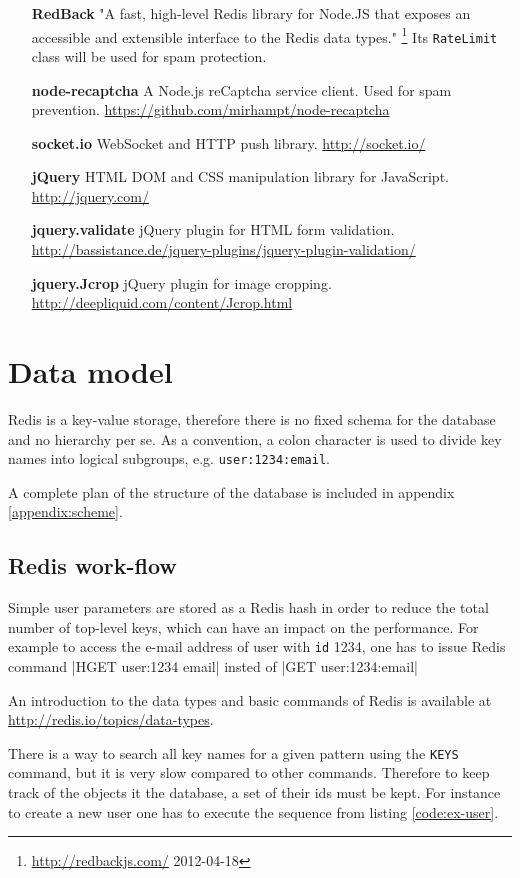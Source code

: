 \documentclass[12pt,oneside]{fithesis}
\begin{document}
\begin{itemize}
			\item[\textbf{RedBack}] "A fast, high-level Redis library for Node.JS that exposes an accessible and extensible interface to the Redis data types." \footnote{\url{http://redbackjs.com/} 2012-04-18} Its \texttt{RateLimit} class will be used for spam protection. 
			\item[\textbf{node-recaptcha}] A Node.js reCaptcha service client. Used for spam prevention. \url{https://github.com/mirhampt/node-recaptcha}
			\item[\textbf{socket.io}] WebSocket and HTTP push library. \url{http://socket.io/}
			\item[\textbf{jQuery}] HTML DOM and CSS manipulation library for JavaScript. \url{http://jquery.com/}
			\item[\textbf{jquery.validate}] jQuery plugin for HTML form validation. \url{http://bassistance.de/jquery-plugins/jquery-plugin-validation/}
			\item[\textbf{jquery.Jcrop}] jQuery plugin for image cropping. \url{http://deepliquid.com/content/Jcrop.html}
			
		\end{itemize}
\section{Data model}
	Redis is a key-value storage, therefore there is no fixed schema for the database and no hierarchy per se.  As a convention, a colon character is used to divide key names into logical subgroups, e.g. \texttt{user:1234:email}. 
	
	A complete plan of the structure of the database is included in appendix \ref{appendix:scheme}.
	\subsection{Redis work-flow}
	Simple user parameters are stored as a Redis hash in order to reduce the total number of top-level keys, which can have an impact on the performance. For example to access the e-mail address of user with \texttt{id} 1234, one has to issue Redis command |HGET user:1234 email| insted of |GET user:1234:email|
	
	
	An introduction to the data types and basic commands of Redis is available at \url{http://redis.io/topics/data-types}.
	
	There is a way to search all key names for a given pattern using the \texttt{KEYS} command, but it is very slow compared to other commands. Therefore to keep track of the objects it the database, a set of their ids must be kept. For instance to create a new user one has to execute the sequence from listing \ref{code:ex-user}.
	
\end{document}
